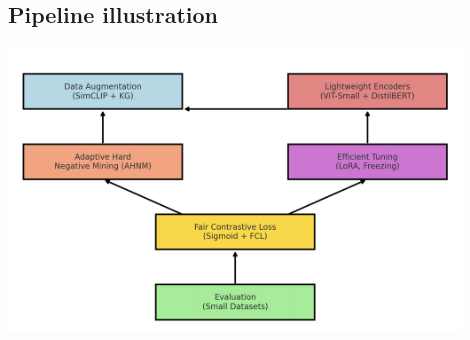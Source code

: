 \documentclass[11pt,letterpaper]{article}
\begin{document}
\subsection{Pipeline illustration}
\begin{center}
\includegraphics[width=12cm]{proposal/pipeline_draft.png}
    
\end{center}


\printbibliography
\end{document}

